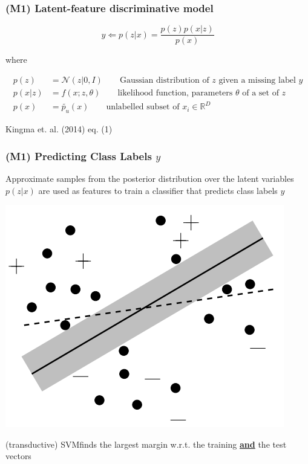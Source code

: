 \documentclass{beamer}
\begin{document}
\begin{frame}
  \frametitle{(M1) Latent-feature discriminative model}

  \[
  y \Leftarrow   p(z|x) = \frac{p(z)p(x|z)}{p(x)}
  \]

  where

  \begin{align*}
    p(z) &= \mathcal{N}(z|0,I) \qquad \text{Gaussian distribution of $z$ given a missing label $y$}\\
    p(x|z) &= f(x;z,\theta) \qquad \text{likelihood function, parameters
      $\theta$ of a set of $z$} \\
    p(x) &= \tilde{p_u}(x) \qquad \text{unlabelled subset of $x_i \in \mathbb{R}^D$}
    \end{align*}

  Kingma et. al. (2014) eq. (1)
\end{frame}

\begin{frame}
  \frametitle{(M1) Predicting Class Labels $y$}

  Approximate samples from the posterior distribution over the
  latent variables $p(z|x)$ are used as features to train a
  classifier that predicts class labels $y$

  \begin{center}
    \includegraphics[scale=0.5]{fig6_2}
  \end{center}

  (transductive) SVM\footnotemark finds the largest margin w.r.t.
  the training \underline{\textbf{and}} the test vectors


\end{frame}
\end{document}
